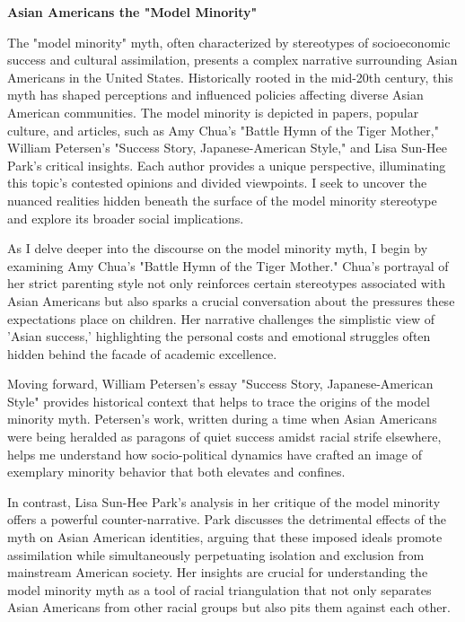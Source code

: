 \documentclass[12pt]{article}
\begin{document}

\begin{center}
  \Large\textbf{Asian Americans the "Model Minority"}
\end{center}

The "model minority" myth, often characterized by stereotypes of socioeconomic success and cultural assimilation, presents a complex narrative surrounding Asian Americans in the United States. Historically rooted in the mid-20th century, this myth has shaped perceptions and influenced policies affecting diverse Asian American communities. The model minority is depicted in papers, popular culture, and articles, such as Amy Chua's "Battle Hymn of the Tiger Mother," William Petersen's "Success Story, Japanese-American Style," and Lisa Sun-Hee Park's critical insights. Each author provides a unique perspective, illuminating this topic's contested opinions and divided viewpoints. I seek to uncover the nuanced realities hidden beneath the surface of the model minority stereotype and explore its broader social implications.

As I delve deeper into the discourse on the model minority myth, I begin by examining Amy Chua’s "Battle Hymn of the Tiger Mother." Chua’s portrayal of her strict parenting style not only reinforces certain stereotypes associated with Asian Americans but also sparks a crucial conversation about the pressures these expectations place on children. Her narrative challenges the simplistic view of 'Asian success,' highlighting the personal costs and emotional struggles often hidden behind the facade of academic excellence.

Moving forward, William Petersen's essay "Success Story, Japanese-American Style" provides historical context that helps to trace the origins of the model minority myth. Petersen's work, written during a time when Asian Americans were being heralded as paragons of quiet success amidst racial strife elsewhere, helps me understand how socio-political dynamics have crafted an image of exemplary minority behavior that both elevates and confines.

In contrast, Lisa Sun-Hee Park’s analysis in her critique of the model minority offers a powerful counter-narrative. Park discusses the detrimental effects of the myth on Asian American identities, arguing that these imposed ideals promote assimilation while simultaneously perpetuating isolation and exclusion from mainstream American society. Her insights are crucial for understanding the model minority myth as a tool of racial triangulation that not only separates Asian Americans from other racial groups but also pits them against each other.
\end{document}
